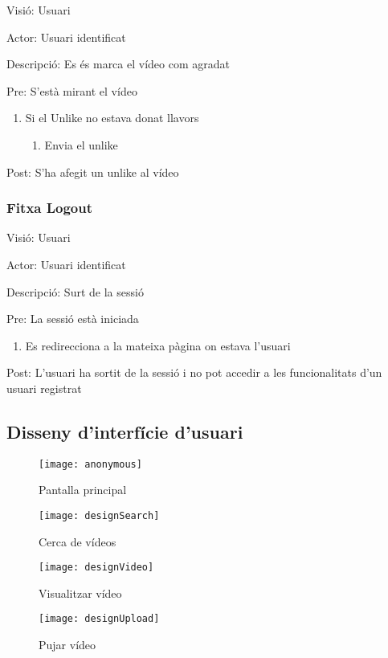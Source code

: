 \documentclass[12pt, titlepage]{article}
\begin{document}
Visió: Usuari

Actor: Usuari identificat

Descripció: Es és marca el vídeo com agradat

Pre: S’està mirant el vídeo

\begin{enumerate}
\item Si el Unlike no estava donat llavors
\begin{enumerate}
\item Envia el unlike
\end{enumerate}
\end{enumerate}

Post: S’ha afegit un unlike al vídeo

\subsubsection{Fitxa Logout}

Visió: Usuari

Actor: Usuari identificat

Descripció: Surt de la sessió

Pre: La sessió està iniciada

\begin{enumerate}
\item Es redirecciona a la mateixa pàgina on estava l’usuari
\end{enumerate}

Post: L’usuari ha sortit de la sessió i no pot accedir a les funcionalitats d’un usuari registrat

\subsection{Disseny d'interfície d'usuari}

\begin{figure}[h]
\centering
\texttt{[image: anonymous]}
\caption{Pantalla principal}
\end{figure}

\begin{figure}[h]
\centering
\texttt{[image: designSearch]}
\caption{Cerca de vídeos}
\end{figure}

\begin{figure}[h]
\centering
\texttt{[image: designVideo]}
\caption{Visualitzar vídeo}
\end{figure}

\begin{figure}[h]
\centering
\texttt{[image: designUpload]}
\caption{Pujar vídeo}
\end{figure}
\end{document}
